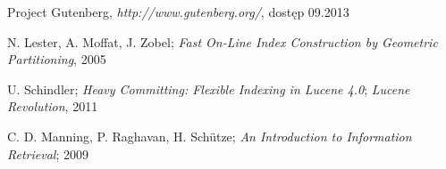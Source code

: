 \begin{thebibliography}{10}
 
  Project Gutenberg, \emph{http://www.gutenberg.org/}, dostęp 09.2013
 
  N. Lester, A. Moffat, J. Zobel; \emph{Fast On-Line Index Construction by Geometric Partitioning}, 2005
 
  U. Schindler; \emph{Heavy Committing: Flexible Indexing in Lucene 4.0}; \emph{Lucene Revolution}, 2011
 
  C. D. Manning, P. Raghavan, H. Sch\"{u}tze; \emph{An Introduction to Information Retrieval}; 2009
 
\end{thebibliography}
